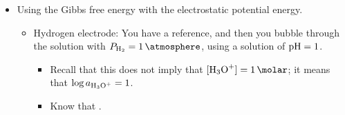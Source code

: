 \documentclass[../notes.tex]{subfiles}
\begin{document}
\begin{itemize}
\begin{itemize}
\begin{itemize}
            \item What we have is  and , so electrons flow through the wire from the zinc anode to the copper cathode.
            \item The overall redox reaction is
            \begin{equation*}
                \ce{Zn_{(s)} + Cu^2+ -> Zn^2+ + Cu_{(s)}}
            \end{equation*}
            \item The relevant molar Gibbs energies of formation ($\Delta\overline{G}_f^\circ$) are zero for the metals, \SI{-147}{\kilo\joule\per\mole} for , and \SI{65}{\kilo\joule\per\mole} for .
            \item Thus, this reaction is spontaneous with $\Delta\overline{G}^\circ=-147-65=\SI{-212}{\kilo\joule\per\mole}$.
        \end{itemize}
        \item We know that $\Delta\overline{G}^\circ=w_{\text{non }PV}=\Delta\overline{Q}\cdot E$ at constant $T,P$, where $E$ is the electrochemical potential.
        \item We also know that $\Delta\overline{Q}=-2e\NA=-2F$ (negative since we're losing electrons) where
        \begin{equation*}
            F = \SI{96485}{\coulomb}
        \end{equation*}
        is the \textbf{Faraday constant}.
        \item Thus,
        \begin{equation*}
            E = \frac{\Delta\overline{G}^\circ}{2F}
            = \frac{-212}{-2F}
            = \frac{-212000}{-2\cdot 96485}
            = \SI{1.1}{\volt}
        \end{equation*}
    \end{itemize}
    \item Using the Gibbs free energy with the electrostatic potential energy.
    \begin{itemize}
        \item Hydrogen electrode: You have a reference, and then you bubble  through the solution with $P_{\ce{H2}}=\SI{1}{\atmosphere}$, using a solution of $\operatorname{pH}=1$.
        \begin{itemize}
            \item Recall that this does not imply that $[\ce{H3O+}]=\SI{1}{\molar}$; it means that $\log a_{\ce{H3O+}}=1$.
            \item Know that .

\end{itemize}
\end{itemize}
\end{itemize}
\end{document}
